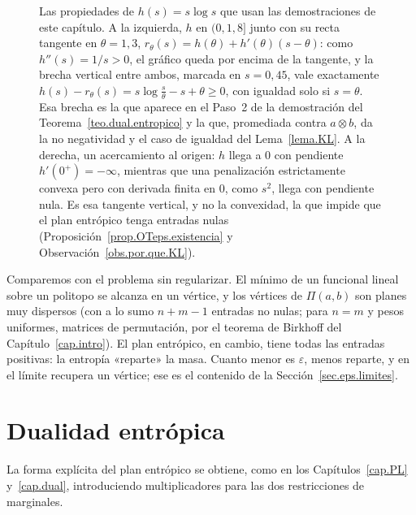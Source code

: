 \documentclass[12pt, a4paper]{amsbook}
\newcommand{\figpanelsep}{6cm}   %
\theoremstyle{remark}
\theoremstyle{definition}
\numberwithin{section}{chapter}
\numberwithin{subsection}{section}
\numberwithin{equation}{section}
\numberwithin{figure}{chapter}
\begin{document}
\begin{figure}[ht]
\caption{Las propiedades de $h(s)=s\log s$ que usan las demostraciones de
este capítulo. A la izquierda, $h$ en $(0,1{,}8]$ junto con su recta tangente
en $\theta=1{,}3$, $r_\theta(s)=h(\theta)+h'(\theta)(s-\theta)$: como
$h''(s)=1/s>0$, el gráfico queda por encima de la tangente, y la brecha
vertical entre ambos, marcada en $s=0{,}45$, vale exactamente
$h(s)-r_\theta(s)=s\log\frac{s}{\theta}-s+\theta\ge0$, con igualdad solo si
$s=\theta$. Esa brecha es la que aparece en el Paso~2 de la demostración del
Teorema~\ref{teo.dual.entropico} y la que, promediada contra
$a\otimes b$, da la no negatividad y el caso de igualdad del
Lema~\ref{lema.KL}. A la derecha, un acercamiento al origen: $h$ llega a
$0$ con pendiente $h'(0^+)=-\infty$, mientras que una penalización
estrictamente convexa pero con derivada finita en $0$, como $s^2$, llega con
pendiente nula. Es esa tangente vertical, y no la convexidad, la que impide
que el plan entrópico tenga entradas nulas
(Proposición~\ref{prop.OTeps.existencia} y
Observación~\ref{obs.por.que.KL}).}
\label{fig.ent.h}
\end{figure}

Comparemos con el problema sin regularizar. El mínimo de un funcional lineal
sobre un politopo se alcanza en un vértice, y los vértices de $\Pi(a,b)$ son
planes muy dispersos (con a lo sumo $n+m-1$ entradas no nulas; para $n=m$ y
pesos uniformes, matrices de permutación, por el teorema de Birkhoff del
Capítulo~\ref{cap.intro}). El plan entrópico, en cambio, tiene todas las
entradas positivas: la entropía «reparte» la masa. Cuanto menor es
$\varepsilon$, menos reparte, y en el límite recupera un vértice; ese es el
contenido de la Sección~\ref{sec.eps.limites}.

\section{Dualidad entrópica}\label{sec.dual.entropico}

La forma explícita del plan entrópico se obtiene, como en los
Capítulos~\ref{cap.PL} y~\ref{cap.dual}, introduciendo multiplicadores para
las dos restricciones de marginales.
\end{document}

